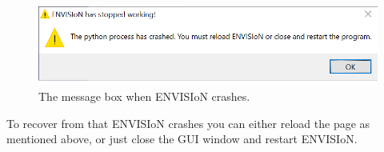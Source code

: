 \begin{figure}[H]
    \centering
    \includegraphics[scale = 0.55]{images/Envisioncrashed.png}
    \caption{The message box when ENVISIoN crashes.}
    \label{fig:GUIcrash}
\end{figure}

To recover from that ENVISIoN crashes you can either reload the page as mentioned above, or just close the GUI window and restart ENVISIoN.
